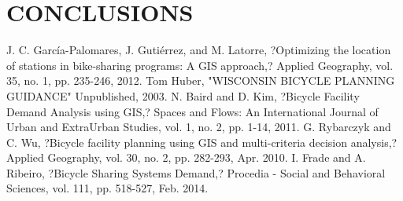 \documentclass[journal, letterpaper]{IEEEtran}
\begin{document}
\section{CONCLUSIONS}
\large
\begin{thebibliography}{99}

 J. C. García-Palomares, J. Gutiérrez, and M. Latorre, ?Optimizing the location of stations in bike-sharing programs: A GIS approach,? Applied Geography, vol. 35, no. 1, pp. 235-246, 2012.
 Tom Huber, "WISCONSIN BICYCLE PLANNING GUIDANCE" Unpublished, 2003.
 N. Baird and D. Kim, ?Bicycle Facility Demand Analysis using GIS,? Spaces and Flows: An International Journal of Urban and ExtraUrban Studies, vol. 1, no. 2, pp. 1-14, 2011.
 G. Rybarczyk and C. Wu, ?Bicycle facility planning using GIS and multi-criteria decision analysis,? Applied Geography, vol. 30, no. 2, pp. 282-293, Apr. 2010.
 I. Frade and A. Ribeiro, ?Bicycle Sharing Systems Demand,? Procedia - Social and Behavioral Sciences, vol. 111, pp. 518-527, Feb. 2014.
 
\end{thebibliography}
\end{document}
